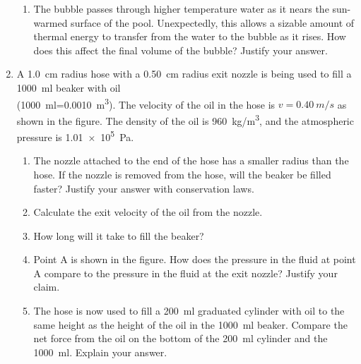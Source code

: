 \documentclass{../../oss-apphys}
\begin{document}
\begin{enumerate}[leftmargin=15pt]
\begin{enumerate}[leftmargin=18pt]
  \item The bubble passes through higher temperature water as it nears the
    sun-warmed surface of the pool. Unexpectedly, this allows a
    sizable amount of thermal energy to transfer from the water to the
    bubble as it rises. How does this affect the final volume of the
    bubble? Justify your answer.
  \end{enumerate}
  \newpage
  
\item A \SI{1.0}{cm} radius hose with a \SI{0.50}{cm} radius exit nozzle is
  being used to fill a \SI{1000}{ml} beaker with oil\\
  (\SI{1000}{ml}=\SI{0.0010}{m^3}). The velocity of the oil in the hose is
  $v=\SI{0.40}{m/s}$ as shown in the figure. The density of the oil is
  \SI{960}{kg/m^3}, and the atmospheric pressure is \SI{1.01e5}{\pascal}.
  \begin{center}
  \end{center}
  
  \begin{enumerate}[leftmargin=18pt]
  \item The nozzle attached to the end of the hose has a smaller radius
    than the hose. If the nozzle is removed from the hose, will the
    beaker be filled faster? Justify your answer with conservation
    laws.
    \vspace{.75in}
    
  \item Calculate the exit velocity of the oil from the nozzle.
    \vspace{.75in}
    
  \item How long will it take to fill the beaker?
    \vspace{.75in}
    
  \item Point A is shown in the figure. How does the pressure in the fluid
    at point A compare to the pressure in the fluid at the exit nozzle?
    Justify your claim.
    \vspace{.75in}
    
  \item The hose is now used to fill a \SI{200}{\milli\litre} graduated
    cylinder with oil to the same height as the height of the oil in the
    \SI{1000}{\milli\litre} beaker. Compare the net force from the oil on the
    bottom of the \SI{200}{\milli\litre} cylinder and the
    \SI{1000}{\milli\litre}. Explain your answer.
    \vspace{1in}
    

\end{enumerate}
\end{enumerate}
\end{document}
